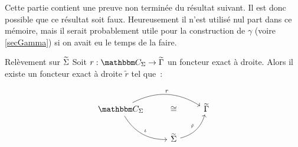 
Cette partie contient une preuve non terminée du résultat suivant. Il est donc
possible que ce résultat soit faux. Heureusement il n'est utilisé nul part dans
ce mémoire, mais il serait probablement utile pour la construction de
$\gamma$ (voire \ref{secGamma}) si on avait eu le temps de la faire.

\begin{theo}{Relèvement sur $\widetilde{\Sigma}$}\label{lifting}
    Soit $r : \C_\Sigma\rightarrow\tgamma$ un foncteur exact à droite. Alors il
    existe un foncteur exact à droite $\tilde{r}$ tel que~:

    \[\begin{tikzcd}
        \C_\Sigma\arrow[dr, bend right, "\iota"]\arrow[rr, bend left, "r"]
            & \cong & \tgamma \\
        & \tsigma\arrow[ur, bend right, "\tilde{r}"] & \\
    \end{tikzcd}\]
\end{theo}

